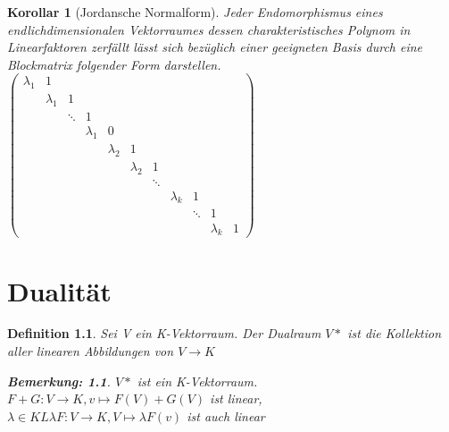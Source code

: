 \documentclass{report}
\newcommand{\lb}{\lambda}
\theoremstyle{customrem}
\newtheorem*{bemerkung}{Bemerkung\textnormal:}
\theoremstyle{customdef}
\newtheorem{definition}{Definition}[chapter]
\newtheorem{korrolar}[definition]{Korollar}
\theoremstyle{customenv}
\begin{document}
\begin{korrolar}[Jordansche Normalform]
  Jeder Endomorphismus eines endlichdimensionalen Vektorraumes dessen
  charakteristisches Polynom in Linearfaktoren zerf\"allt l\"asst sich
  bez\"uglich einer geeigneten Basis durch eine Blockmatrix folgender Form
  darstellen.\\
  \(
  \left (
  \begin{array}{cccccccccccc}
    \lb_1&1\\
    &\lb_1&1\\
    & &\ddots&1\\
    &&&\lb_1&0\\
    &&&&\lb_2&1\\
    &&&&&\lb_2& 1\\
    &&&&&&\ddots\\
    &&&&&&&\lb_k & 1\\
    &&&&&&&&\ddots & 1\\
    &&&&&&&&&\lb_k & 1
  \end{array}
  \right )
  \)
\end{korrolar}

\chapter{Dualit\"at}

\begin{definition}
Sei V ein K-Vektorraum. Der Dualraum \(V*\) ist die Kollektion aller linearen
Abbildungen von \(V \to K\)
\begin{bemerkung}
\(V*\) ist ein K-Vektorraum.
\(F + G : V \to K, v \mapsto  F(V) + G(V)\) ist linear,\\
\(\lb \in K L \lb F : V \to K, V \mapsto \lb F(v)\) ist auch linear
\end{bemerkung}
\end{definition}
\end{document}
